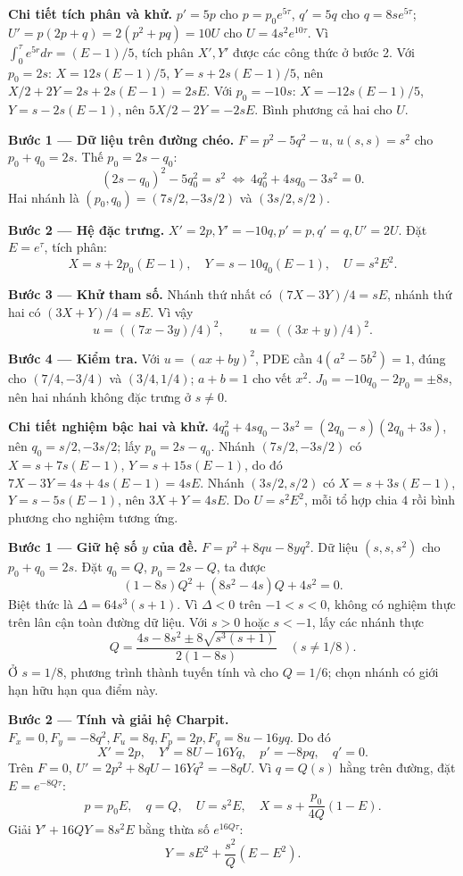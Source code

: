 \textbf{Chi tiết tích phân và khử.} $p'=5p$ cho $p=p_0e^{5\tau}$, $q'=5q$ cho $q=8se^{5\tau}$; $U'=p(2p+q)=2(p^2+pq)=10U$ cho $U=4s^2e^{10\tau}$. Vì $\int_0^\tau e^{5r}dr=(E-1)/5$, tích phân $X',Y'$ được các công thức ở bước 2. Với $p_0=2s$: $X=12s(E-1)/5$, $Y=s+2s(E-1)/5$, nên $X/2+2Y=2s+2s(E-1)=2sE$. Với $p_0=-10s$: $X=-12s(E-1)/5$, $Y=s-2s(E-1)$, nên $5X/2-2Y=-2sE$. Bình phương cả hai cho $U$.

\textbf{Bước 1 — Dữ liệu trên đường chéo.} $F=p^2-5q^2-u$, $u(s,s)=s^2$ cho $p_0+q_0=2s$. Thế $p_0=2s-q_0$:
\[(2s-q_0)^2-5q_0^2=s^2\ \Longleftrightarrow\ 4q_0^2+4sq_0-3s^2=0.\]
Hai nhánh là $(p_0,q_0)=(7s/2,-3s/2)$ và $(3s/2,s/2)$.

\textbf{Bước 2 — Hệ đặc trưng.} $X'=2p,Y'=-10q,p'=p,q'=q,U'=2U$. Đặt $E=e^\tau$, tích phân:
\[X=s+2p_0(E-1),\quad Y=s-10q_0(E-1),\quad U=s^2E^2.\]

\textbf{Bước 3 — Khử tham số.} Nhánh thứ nhất có $(7X-3Y)/4=sE$, nhánh thứ hai có $(3X+Y)/4=sE$. Vì vậy
\[u=((7x-3y)/4)^2,\qquad u=((3x+y)/4)^2.\]

\textbf{Bước 4 — Kiểm tra.} Với $u=(ax+by)^2$, PDE cần $4(a^2-5b^2)=1$, đúng cho $(7/4,-3/4)$ và $(3/4,1/4)$; $a+b=1$ cho vết $x^2$. $J_0=-10q_0-2p_0=\pm8s$, nên hai nhánh không đặc trưng ở $s\ne0$.

\textbf{Chi tiết nghiệm bậc hai và khử.} $4q_0^2+4sq_0-3s^2=(2q_0-s)(2q_0+3s)$, nên $q_0=s/2,-3s/2$; lấy $p_0=2s-q_0$. Nhánh $(7s/2,-3s/2)$ có $X=s+7s(E-1)$, $Y=s+15s(E-1)$, do đó $7X-3Y=4s+4s(E-1)=4sE$. Nhánh $(3s/2,s/2)$ có $X=s+3s(E-1)$, $Y=s-5s(E-1)$, nên $3X+Y=4sE$. Do $U=s^2E^2$, mỗi tổ hợp chia $4$ rồi bình phương cho nghiệm tương ứng.

\textbf{Bước 1 — Giữ hệ số $y$ của đề.} $F=p^2+8qu-8yq^2$. Dữ liệu $(s,s,s^2)$ cho $p_0+q_0=2s$. Đặt $q_0=Q$, $p_0=2s-Q$, ta được
\[(1-8s)Q^2+(8s^2-4s)Q+4s^2=0.\]
Biệt thức là $\Delta=64s^3(s+1)$. Vì $\Delta<0$ trên $-1<s<0$, không có nghiệm thực trên lân cận toàn đường dữ liệu. Với $s>0$ hoặc $s<-1$, lấy các nhánh thực
\[Q=\frac{4s-8s^2\pm8\sqrt{s^3(s+1)}}{2(1-8s)}\quad(s\ne1/8).\]
Ở $s=1/8$, phương trình thành tuyến tính và cho $Q=1/6$; chọn nhánh có giới hạn hữu hạn qua điểm này.

\textbf{Bước 2 — Tính và giải hệ Charpit.} $F_x=0,F_y=-8q^2,F_u=8q,F_p=2p,F_q=8u-16yq$. Do đó
\[X'=2p,\quad Y'=8U-16Yq,\quad p'=-8pq,\quad q'=0.\]
Trên $F=0$, $U'=2p^2+8qU-16Yq^2=-8qU$. Vì $q=Q(s)$ hằng trên đường, đặt $E=e^{-8Q\tau}$:
\[p=p_0E,\quad q=Q,\quad U=s^2E,\quad X=s+\frac{p_0}{4Q}(1-E).\]
Giải $Y'+16QY=8s^2E$ bằng thừa số $e^{16Q\tau}$:
\[Y=sE^2+\frac{s^2}{Q}(E-E^2).\]

